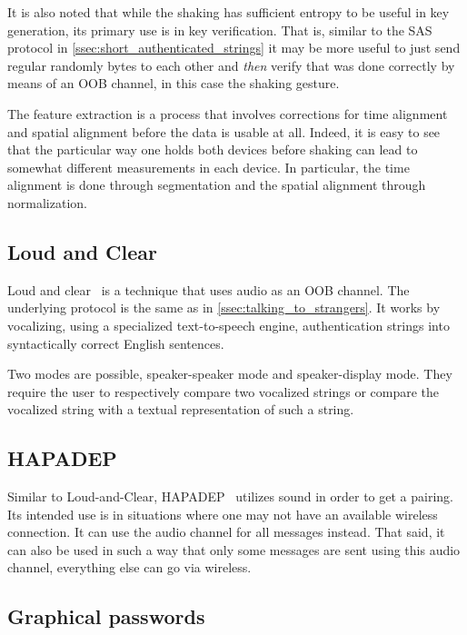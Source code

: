 \documentclass[conference, 12pt]{sty/IEEEtran}
\begin{document}
It is also noted that while the shaking has sufficient entropy to be useful in key generation, its primary use is in key verification.
That is, similar to the SAS protocol in \autoref{ssec:short_authenticated_strings} it may be more useful to just send regular randomly bytes to each other and \emph{then} verify that was done correctly by means of an OOB channel, in this case the shaking gesture.

The feature extraction is a process that involves corrections for time alignment and spatial alignment before the data is usable at all.
Indeed, it is easy to see that the particular way one holds both devices before shaking can lead to somewhat different measurements in each device.
In particular, the time alignment is done through segmentation and the spatial alignment through normalization.

\subsection{Loud and Clear}
\label{ssec:loud_and_clear}

Loud and clear~\cite{goodrich2006loud} is a technique that uses audio as an OOB channel.
The underlying protocol is the same as in \autoref{ssec:talking_to_strangers}.
It works by vocalizing, using a specialized text-to-speech engine, authentication strings into syntactically correct English sentences.

Two modes are possible, speaker-speaker mode and speaker-display mode.
They require the user to respectively compare two vocalized strings or compare the vocalized string with a textual representation of such a string.

\subsection{HAPADEP}
\label{ssec:hapadep}

Similar to Loud-and-Clear, HAPADEP~\cite{soriente2008hapadep} utilizes sound in order to get a pairing.
Its intended use is in situations where one may not have an available wireless connection.
It can use the audio channel for all messages instead.
That said, it can also be used in such a way that only some messages are sent using this audio channel, everything else can go via wireless.


\subsection{Graphical passwords}
\label{ssec:graphical_passwords}
\end{document}
